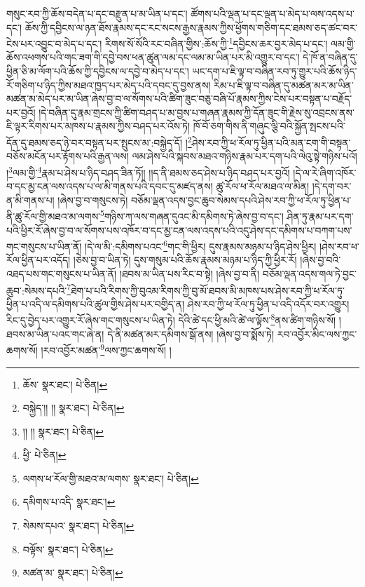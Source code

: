 གསུང་རབ་ཀྱི་ཆོས་བདེན་པ་དང་བརྫུན་པ་མ་ཡིན་པ་དང་། ཚོགས་པའི་ལྡན་པ་དང་ལྡན་པ་མེད་པ་ལས་འདས་པ་དང་། ཆོས་ཀྱི་དབྱིངས་ལ་ཉན་ཐོས་རྣམས་དང་རང་སངས་རྒྱས་རྣམས་ཀྱིས་ཕྱོགས་གཅིག་དང་ཐམས་ཅད་ཚང་བར་ངེས་པར་འབྱུང་བ་མེད་པ་དང་། རིགས་སོ་སོའི་རང་བཞིན་གྱིས་:ཆོས་ཀྱི་\footnote{ཆོས་  སྣར་ཐང་།  པེ་ཅིན། }དབྱིངས་ཆར་བྱར་མེད་པ་དང་། ལམ་གྱི་ཆོས་འཕགས་པའི་གང་ཟག་གི་དབྱེ་བས་ཕན་ཚུན་ལམ་དང་ལམ་མ་ཡིན་པར་མི་འགྱུར་བ་དང་། དེ་ཁོ་ན་བཞིན་དུ་ཕྱིན་ཅི་མ་ལོག་པའི་ཆོས་ཀྱི་དབྱིངས་ལ་དབྱེ་བ་མེད་པ་དང་། ཡང་དག་པ་ཇི་ལྟ་བ་བཞིན་རབ་ཏུ་གྱུར་པའི་ཆོས་ཉིད་རོ་གཅིག་པ་ཉིད་ཀྱིས་མཐའ་ཁྱད་པར་མེད་པའི་དབང་དུ་བྱས་ནས། རིམ་པ་ཇི་ལྟ་བ་བཞིན་དུ་མཚན་མར་མ་ཡིན་མཚན་མ་མེད་པར་མ་ཡིན་ཞེས་བྱ་བ་ལ་སོགས་པའི་ཚིག་ཟུང་བཅུ་བཞི་པོ་རྣམས་ཀྱིས་ངེས་པར་བསྟན་པ་བརྗོད་པར་བྱའོ། །དེ་བཞིན་དུ་རྣམ་གྲངས་ཀྱི་ཚིག་བཤད་པ་མ་བྱས་པ་གཞན་རྣམས་ཀྱི་དོན་ཟུང་གི་རྗེས་སུ་འབྲངས་ནས་ཇི་ལྟར་རིགས་པར་མཁས་པ་རྣམས་ཀྱིས་བཤད་པར་འོས་ཏེ། ཁོ་བོ་ཅག་གིས་ནི་གཞུང་ལྕི་བའི་སྐྱོན་སྤངས་པའི་དོན་དུ་ཐམས་ཅད་ཉེ་བར་བསྟན་པར་སྤུངས་མ་:བསྐྱེད་དོ། །\footnote{བསྐྱེད་།། །།  སྣར་ཐང་།  པེ་ཅིན། }ཤེས་རབ་ཀྱི་ཕ་རོལ་ཏུ་ཕྱིན་པའི་མན་ངག་གི་བསྟན་བཅོས་མངོན་པར་རྟོགས་པའི་རྒྱན་ལས། ལམ་ཤེས་པའི་སྐབས་མཐའ་གཉིས་རྣམ་པར་དག་པའི་ལེའུ་སྟེ་གཉིས་པའོ། །\footnote{།། །།  སྣར་ཐང་།  པེ་ཅིན། }ལམ་གྱི་\footnote{ཕྱི་  པེ་ཅིན། }རྣམ་པ་ཤེས་པ་ཉིད་བཤད་ཟིན་ཏོ།། །།ད་ནི་ཐམས་ཅད་ཤེས་པ་ཉིད་བཤད་པར་བྱའོ། །དེ་ལ་རེ་ཞིག་འཁོར་བ་དང་མྱ་ངན་ལས་འདས་པ་ལ་མི་གནས་པའི་དབང་དུ་མཛད་ནས། ཚུ་རོལ་ཕ་རོལ་མཐའ་ལ་མིན། །དེ་དག་བར་ན་མི་གནས་པ། །ཞེས་བྱ་བ་གསུངས་ཏེ། བཅོམ་ལྡན་འདས་བྱང་ཆུབ་སེམས་དཔའི་ཤེས་རབ་ཀྱི་ཕ་རོལ་ཏུ་ཕྱིན་པ་ནི་ཚུ་རོལ་གྱི་མཐའ་མ་ལགས་\footnote{ལགས་ཕ་རོལ་གྱི་མཐའ་མ་ལགས་  སྣར་ཐང་།  པེ་ཅིན། }གཉིས་ཀ་ལས་གཞན་དུའང་མི་དམིགས་ཏེ་ཞེས་བྱ་བ་དང་། ཤིན་ཏུ་རྣམ་པར་དག་པའི་ཕྱིར་རོ་ཞེས་བྱ་བ་ལ་སོགས་པས་འཁོར་བ་དང་མྱ་ངན་ལས་འདས་པའི་འདུ་ཤེས་དང་དམིགས་པ་བཀག་པས་གང་གསུངས་པ་ཡིན་ནོ། །དེ་ལ་མི་:དམིགས་པའང་\footnote{དམིགས་པ་འདི་  སྣར་ཐང་། }གང་གི་ཕྱིར། དུས་རྣམས་མཉམ་པ་ཉིད་ཤེས་ཕྱིར། །ཤེས་རབ་ཕ་རོལ་ཕྱིན་པར་འདོད། །ཅེས་བྱ་བ་ཡིན་ཏེ། དུས་གསུམ་པའི་ཆོས་རྣམས་མཉམ་པ་ཉིད་ཀྱི་ཕྱིར་རོ། །ཞེས་བྱ་བའི་འཐད་པས་གང་གསུངས་པ་ཡིན་ནོ། །ཐབས་མ་ཡིན་པས་རིང་བ་སྟེ། །ཞེས་བྱ་བ་ནི། བཅོམ་ལྡན་འདས་གལ་ཏེ་བྱང་ཆུབ་:སེམས་དཔའི་\footnote{སེམས་དཔའ་  སྣར་ཐང་།  པེ་ཅིན། }ཐེག་པ་པའི་རིགས་ཀྱི་བུའམ་རིགས་ཀྱི་བུ་མོ་ཐབས་མི་མཁས་པས་ཤེས་རབ་ཀྱི་ཕ་རོལ་ཏུ་ཕྱིན་པ་འདི་ལ་དམིགས་པའི་ཚུལ་གྱིས་ཤེས་པར་བགྱིད་ན། ཤེས་རབ་ཀྱི་ཕ་རོལ་ཏུ་ཕྱིན་པ་འདི་འདོར་བར་འགྱུར། རིང་དུ་བྱེད་པར་འགྱུར་རོ་ཞེས་གང་གསུངས་པ་ཡིན་ཏེ། དེའི་ཚེ་དང་ཕྱི་མའི་ཚེ་ལ་ལྟོས་\footnote{བལྟོས་  སྣར་ཐང་།  པེ་ཅིན། }ནས་ཚིག་གཉིས་སོ། །ཐབས་མ་ཡིན་པའང་གང་ཞེ་ན། དེ་ནི་མཚན་མར་དམིགས་སྒོ་ནས། །ཞེས་བྱ་བ་སྨོས་ཏེ། རབ་འབྱོར་མིང་ལས་ཀྱང་ཆགས་སོ། །རབ་འབྱོར་མཚན་\footnote{མཚན་མ་  སྣར་ཐང་།  པེ་ཅིན། }ལས་ཀྱང་ཆགས་སོ། །
